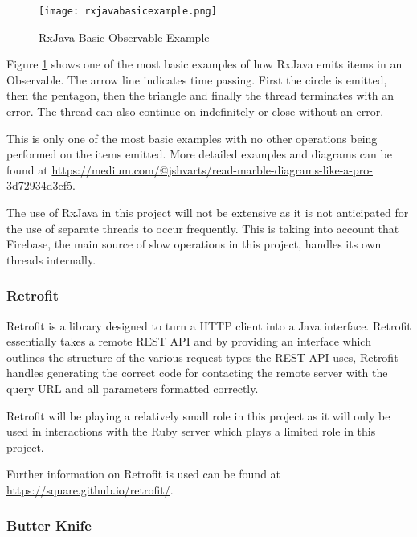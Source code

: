 \begin{figure}[ht]
  \centering
      \texttt{[image: rxjavabasicexample.png]}
  \caption[RxJava Basic Observable Example]{RxJava Basic Observable Example\cite{rxjavamarblediagram}}
  \label{fig:rxjavamarblediagram}
\end{figure}

Figure \ref{fig:rxjavamarblediagram} shows one of the most basic examples of how RxJava emits items in an Observable. The arrow line indicates time passing. First the circle is emitted, then the pentagon, then the triangle and finally the thread terminates with an error. The thread can also continue on indefinitely or close without an error.

This is only one of the most basic examples with no other operations being performed on the items emitted. More detailed examples and diagrams can be found at \url{https://medium.com/@jshvarts/read-marble-diagrams-like-a-pro-3d72934d3ef5}.

The use of RxJava in this project will not be extensive as it is not anticipated for the use of separate threads to occur frequently. This is taking into account that Firebase, the main source of slow operations in this project, handles its own threads internally.

\subsubsection{Retrofit}

Retrofit is a library designed to turn a HTTP client into a Java interface. Retrofit essentially takes a remote REST API and by providing an interface which outlines the structure of the various request types the REST API uses, Retrofit handles generating the correct code for contacting the remote server with the query URL and all parameters formatted correctly\cite{retrofit}.

Retrofit will be playing a relatively small role in this project as it will only be used in interactions with the Ruby server which plays a limited role in this project.

Further information on Retrofit is used can be found at \url{https://square.github.io/retrofit/}.

\subsubsection{Butter Knife}

